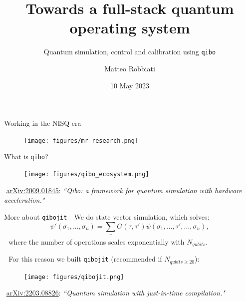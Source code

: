 \documentclass[9pt, xcolor={svgnames}, hyperref={colorlinks, linkcolor=black, citecolor=amethyst, urlcolor=amethyst}]{beamer}
\title{Towards a full-stack quantum operating system}
\subtitle{Quantum simulation, control and calibration using \texttt{qibo}}
\date{10 May 2023}
\author[Matteo Robbiati]{Matteo Robbiati}
\begin{document}
\maketitle

\begin{frame}{Working in the NISQ era}
    \begin{figure}  
    \texttt{[image: figures/mr\_research.png]}
    \end{figure}
    \vspace{-0.5cm}
\end{frame}

\begin{frame}{What is \texttt{qibo}?}
\small
    \begin{figure}  
    \texttt{[image: figures/qibo\_ecosystem.png]}
    \end{figure}
    \vfill
    \footnotesize
    \faBook\,\,\href{https://arxiv.org/abs/2009.01845}{arXiv:2009.01845}: \textit{``Qibo: a framework for quantum simulation with hardware acceleration."}\\
\end{frame}

\begin{frame}{More about \texttt{qibojit}}
\small
\faArrowCircleRight\,\, We do state vector simulation, which solves:
\begin{equation}
\psi'(\sigma_1, ..., \sigma_n) = \sum_{\tau'}G(\tau, \tau') \psi(\sigma_1, ..., 
\tau', ..., \sigma_n),
\end{equation}
\pause
\faArrowCircleRight\,\, where the number of operations scales exponentially with $N_{qubits}$.

\pause
\faArrowCircleRight\,\, For this reason we built \texttt{qibojit} (recommended if $N_{qubits \geq 20}$):
    \begin{figure}  
    \texttt{[image: figures/qibojit.png]}
    \end{figure}
    \vfill
    \footnotesize
    \faBook\,\,\href{https://arxiv.org/abs/2203.08826}{arXiv:2203.08826}: \textit{``Quantum simulation with just-in-time compilation."}\\
\end{frame}
\end{document}
